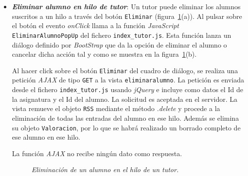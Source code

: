 \documentclass[a4paper, 12pt]{book}
\begin{document}
\begin{itemize}
  
  \item {\bfseries \textit{Eliminar alumno en hilo de tutor}}: Un tutor puede eliminar los alumnos suscritos a un hilo a trav\'es del 
  bot\'on \texttt{Eliminar} (figura~\ref{fig:eliminaralumno}(a)). Al pulsar sobre el bot\'on el evento \textit{onClick} llama a la funci\'on 
  \textit{JavaScript} \texttt{EliminarAlumnoPopUp} del fichero \texttt{index\_tutor.js}. Esta funci\'on lanza un di\'alogo definido por \textit{BootStrap} 
  que da la opci\'on de eliminar el alumno o cancelar dicha acci\'on tal y como se muestra en la figura~\ref{fig:eliminaralumno}(b). 
  
  Al hacer click sobre el bot\'on \texttt{Eliminar} del cuadro de di\'alogo, se realiza una petici\'on \textit{AJAX} de tipo \texttt{GET} a la vista 
  \texttt{eliminaralumno}. La petici\'on es enviada desde el fichero \texttt{index\_tutor.js} usando \textit{jQuery} e incluye como datos el 
  Id de la asignatura y el Id del alumno. La solicitud es aceptada en el servidor. La vista remueve el objeto \texttt{RSS} mediante el m\'etodo 
  \textit{.delete} y procede a la eliminaci\'on de todas las entradas del alumno en ese hilo. Adem\'as se elimina su objeto \texttt{Valoracion},
  por lo que se habr\'a realizado un borrado completo de ese alumno en ese hilo.
  
  La funci\'on \textit{AJAX} no recibe ning\'un dato como respuesta.
  
  \begin{figure}
    \centering
    \caption{\textit{Eliminaci\'on de un alumno en el hilo de un tutor.}}
    \label{fig:eliminaralumno}
  \end{figure}
  

\end{itemize}
\end{document}
